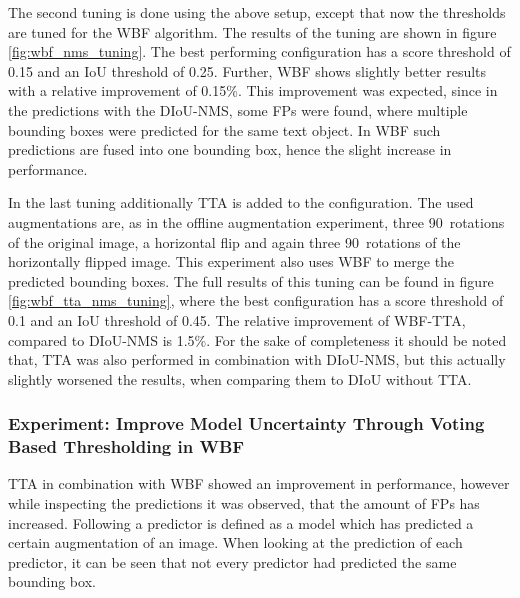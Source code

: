 The second tuning is done using the above setup, except that now the thresholds are tuned for the \ac{WBF} algorithm.
The results of the tuning are shown in figure \ref{fig:wbf_nms_tuning}.
The best performing configuration has a score threshold of 0.15 and an \ac{IoU} threshold of 0.25.
Further, \ac{WBF} shows slightly better results with a relative improvement of 0.15\%.
This improvement was expected, since in the predictions with the DIoU-NMS, some \acp{FP} were found, where multiple bounding boxes were predicted for the same text object.
In \ac{WBF} such predictions are fused into one bounding box, hence the slight increase in performance.


In the last tuning additionally \ac{TTA} is added to the configuration.
The used augmentations are, as in the offline augmentation experiment, three 90\textdegree\ rotations of the original image, a horizontal flip and again three 90\textdegree\ rotations of the horizontally flipped image.
This experiment also uses \ac{WBF} to merge the predicted bounding boxes.
The full results of this tuning can be found in figure \ref{fig:wbf_tta_nms_tuning}, where the best configuration has a score threshold of 0.1 and an \ac{IoU} threshold of 0.45.
The relative improvement of \ac{WBF}-\ac{TTA}, compared to \ac{DIoU}-\ac{NMS} is 1.5\%.
For the sake of completeness it should be noted that, \ac{TTA} was also performed in combination with \ac{DIoU}-\ac{NMS}, but this actually slightly worsened the results, when comparing them to \ac{DIoU} without \ac{TTA}.



\subsubsection{Experiment: Improve Model Uncertainty Through Voting Based Thresholding in \ac{WBF}}

\ac{TTA} in combination with \ac{WBF} showed an improvement in performance, however while inspecting the predictions it was observed, that the amount of \acp{FP} has increased.
Following a predictor is defined as a model which has predicted a certain augmentation of an image.
When looking at the prediction of each predictor, it can be seen that not every predictor had predicted the same bounding box.

